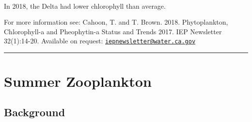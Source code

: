 \documentclass[
]{book}
\begin{document}
\begin{panel-grid}
\begin{columns-nocenter}
\begin{column800}
\end{column800}

\begin{column40}

~

\end{column40}

\begin{column800}

In 2018, the Delta had lower chlorophyll than average.

\end{column800}

\end{columns-nocenter}

\end{panel-grid}

\begin{disclaimer}
For more information see: Cahoon, T. and T. Brown. 2018. Phytoplankton,
Chlorophyll-a and Pheophytin-a Status and Trends 2017. IEP Newsletter
32(1):14-20. Available on request:
\href{mailto:iepnewsletter@water.ca.gov}{\nolinkurl{iepnewsletter@water.ca.gov}}
\end{disclaimer}

\begin{center}\rule{0.5\linewidth}{0.5pt}\end{center}

\hypertarget{summer-zooplankton}{%
\section{Summer Zooplankton}\label{summer-zooplankton}}

\hypertarget{background-3}{%
\subsection{Background}\label{background-3}}
\end{document}
